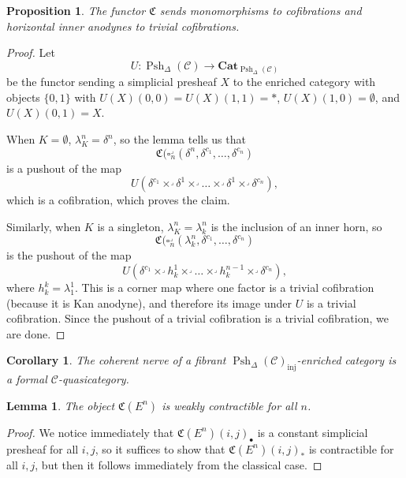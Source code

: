 \documentclass{amsart}
\numberwithin{equation}{section}
\theoremstyle{plain}   %
\newtheorem{prop}[subsection]{Proposition}
\newtheorem{cor}[subsection]{Corollary}
\newtheorem{lemma}[subsection]{Lemma}
\theoremstyle{remark}
\theoremstyle{plain}
\DeclareMathOperator{\Psh}{Psh}
\newcommand{\Cat}{\ensuremath{\mathbf{Cat}}}
\newcommand{\C}{\ensuremath{\mathcal{C}}}
\begin{document}
\begin{prop}\label{quillen1}
	The functor \(\mathfrak{C}\) sends monomorphisms to cofibrations and horizontal inner anodynes to trivial cofibrations.
\end{prop}
\begin{proof}
	Let \[U:\Psh_\Delta(\C) \to \Cat_{\Psh_\Delta(\C)}\] be the functor sending a simplicial presheaf \(X\) to the enriched category with objects \(\{0,1\}\) with \(U(X)(0,0)=U(X)(1,1)=\ast\), \(U(X)(1,0)=\emptyset\), and \(U(X)(0,1)=X\).

	When \(K=\emptyset\), \(\lambda^n_K=\delta^n\), so the lemma tells us that \[\mathfrak{C}(\square^\lrcorner_n(\delta^n,\delta^{c_1},\dots,\delta^{c_n})\] is a pushout of the map \[U(\delta^{c_1}\times^\lrcorner \delta^1 \times^\lrcorner \dots \times^\lrcorner \delta^1 \times^\lrcorner \delta^{c_n}),\] which is a cofibration, which proves the claim.

	Similarly, when \(K\) is a singleton, \(\lambda^n_K=\lambda^n_k\) is the inclusion of an inner horn, so \[\mathfrak{C}(\square^\lrcorner_n(\lambda^n_k,\delta^{c_1},\dots,\delta^{c_n})\] is the pushout of the map \[U(\delta^{c_1}\times^\lrcorner h^1_k \times^\lrcorner \dots \times^\lrcorner h^{n-1}_k \times^\lrcorner \delta^{c_n}),\] where \(h^k_k=\lambda^1_1\).  This is a corner map where one factor is a trivial cofibration (because it is Kan anodyne), and therefore its image under \(U\) is a trivial cofibration.  Since the pushout of a trivial cofibration is a trivial cofibration, we are done.
\end{proof}

\begin{cor}
	The coherent nerve of a fibrant \(\Psh_\Delta(\C)_{\mathrm{inj}}\)-enriched category is a formal \(\C\)-quasicategory.
\end{cor}

\begin{lemma}
	The object \(\mathfrak{C}(E^n)\) is weakly contractible for all \(n\).
\end{lemma}
\begin{proof}
	We notice immediately that \(\mathfrak{C}(E^n)(i,j)_\bullet\) is a constant simplicial presheaf for all \(i,j\), so it suffices to show that \(\mathfrak{C}(E^n)(i,j)_\ast\) is contractible for all \(i,j\), but then it follows immediately from the classical case.
\end{proof}
\end{document}
